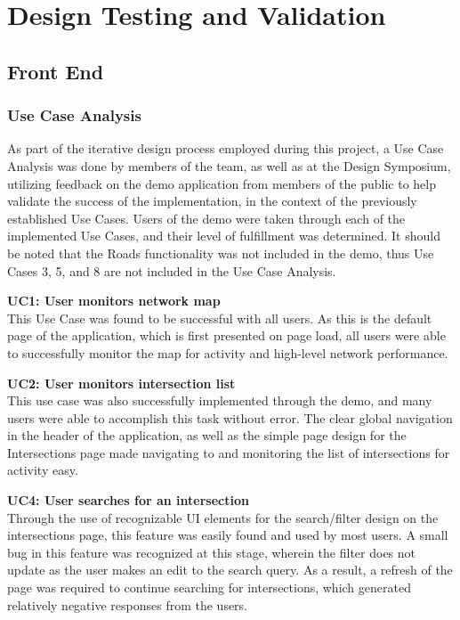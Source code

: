 \documentclass{report}
\begin{document}
\newpage
\chapter{Design Testing and Validation}

\section{Front End}
\subsection{Use Case Analysis}
As part of the iterative design process employed during this project, a Use Case Analysis was done by members of the team, as well as at the Design Symposium, utilizing feedback on the demo application from members of the public to help validate the success of the implementation, in the context of the previously established Use Cases.
Users of the demo were taken through each of the implemented Use Cases, and their level of fulfillment was determined.
It should be noted that the Roads functionality was not included in the demo, thus Use Cases 3, 5, and 8 are not included in the Use Case Analysis.

\noindent \textbf{UC1: User monitors network map} \\
This Use Case was found to be successful with all users.
As this is the default page of the application, which is first presented on page load, all users were able to successfully monitor the map for activity and high-level network performance.

\noindent \textbf{UC2: User monitors intersection list} \\
This use case was also successfully implemented through the demo, and many users were able to accomplish this task without error.
The clear global navigation in the header of the application, as well as the simple page design for the Intersections page made navigating to and monitoring the list of intersections for activity easy.

\noindent \textbf{UC4: User searches for an intersection} \\
Through the use of  recognizable UI elements for the search/filter design on the intersections page, this feature was easily found and used by most users.
A small bug in this feature was recognized at this stage, wherein the filter does not update as the user makes an edit to the search query. 
As a result, a refresh of the page was required to continue searching for intersections, which generated relatively negative responses from the users.
\end{document}
